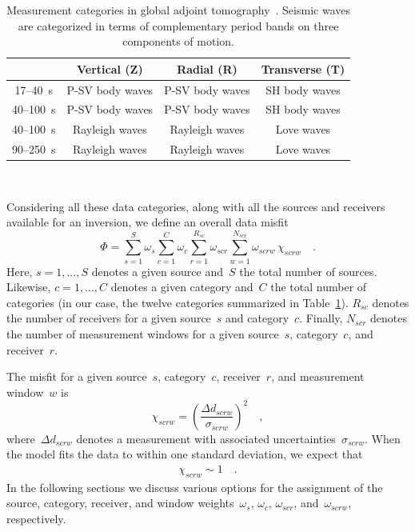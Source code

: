 \begin{table}
\caption{\small{Measurement categories in global adjoint tomography~\cite{bozdaug2016global, Lei2018}.
Seismic waves are categorized in terms of complementary 
period bands on three components of motion.}}
\begin{tabular}{|c|c|c|c|}
\hline

~         &  Vertical (Z) & Radial (R) &  Transverse (T) \\
\hline
17--40~s           &   P-SV body waves                        & P-SV body waves                       & SH body waves   \\
40--100~s         &   P-SV body waves                        & P-SV body waves                       & SH body waves \\
40--100~s         &   Rayleigh waves                           & Rayleigh waves                           & Love waves \\
90--250~s         &   Rayleigh waves                           & Rayleigh waves                           & Love waves \\
\hline
\end{tabular}\\
\label{table:categories}
\end{table}

Considering all these data categories, along with all the sources and receivers available for an inversion, we define an overall data misfit
\begin{equation}
\label{eq:misfit}
\Phi = \sum_{s=1}^{S} \omega_s \sum_{c=1}^{C} \omega_{c} \sum_{r=1}^{R_{sc}} \omega_{scr} \sum_{w=1}^{N_{scr}} \omega_{scrw}\, \chi_{scrw}
\quad .
\end{equation}
Here, $s = 1, ... , S$ denotes a given source and~$S$ the total number of sources.  Likewise, $c = 1, ..., C$ denotes a given category and~$C$  the total number of categories (in our case, the twelve categories summarized in Table~\ref{table:categories}).
$R_{sc}$ denotes the number of receivers for a given source~$s$ and category~$c$. Finally, $N_{scr}$ denotes the number of measurement windows for a given source~$s$, category~$c$, and receiver~$r$.

The misfit for a given source~$s$,
category~$c$, receiver~$r$, and measurement window~$w$ is
\begin{equation}
\label{eq:misfit_def}
\chi_{scrw} = \left(\frac{\Delta d_{scrw}}{\sigma_{scrw}}\right)^2
\quad ,
\end{equation}
where~$\Delta d_{scrw}$ denotes a measurement with associated uncertainties~$\sigma_{scrw}$.
When the model fits the data to within one standard deviation, we expect that
\begin{align}
\chi_{scrw} \sim 1
\quad .
\end{align}
In the following sections we discuss various options for the assignment of the 
source, category, receiver, and window weights~$\omega_s$,
$\omega_{c}$, $\omega_{scr}$, and~$ \omega_{scrw}$, respectively.
%
